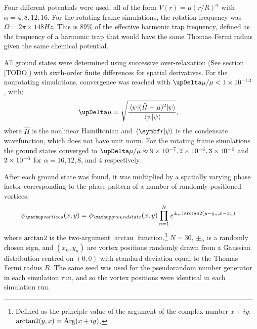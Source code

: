 Four different potentials were used, all of the form $V(r) = \mu \left(r/R\right)^\alpha$ with $\alpha = 4, 8, 12, 16$. For the rotating frame simulations, the rotation frequency was $\Omega = 2\pi \times 148\unit{Hz}$. This is $89\%$ of the effective harmonic trap frequency, defined as the frequency of a harmonic trap that would have the same Thomas--Fermi radius given the same chemical potential.

All ground states were determined using successive over-relaxation (See section [TODO]) with sixth-order finite differences for spatial derivatives. For the nonrotating simulations, convergence was reached with $\upDelta\mu/\mu < 1\E{-13}$, with:
\begin{equation}
\upDelta\mu = \sqrt{\frac{\matrixel{\psi} {(\hat H - \mu)^2}{\psi}}{\braket {\psi}{\psi}}},
\end{equation}
where $\hat H$ is the nonlinear Hamiltonian and $\braket{\vec r}{\psi}$ is the condensate wavefunction, which does not have unit norm. For the rotating frame simulations the ground states converged to $\upDelta\mu/\mu \approx 9\E{-7}, 2\E{-6}, 3\E{-6}$ and $2\times 10^{-6}$ for $\alpha = 16, 12, 8$, and $4$ respectively.

After each ground state was found, it was multiplied by a spatially varying phase factor corresponding to the phase pattern of a number of randomly positioned vortices:
\begin{align}
\psi_\up{vortices}(x, y) = \psi_\up{ground state}(x, y)\prod_{n=1}^N e^{\pm_n i\arctantwo(y - y_n, x - x_n)}
\end{align}
where $\operatorname{arctan2}$ is the two-argument $\arctan$ function,\footnote{Defined as the principle value of the argument of the complex number $x + iy$: \mbox{$\operatorname{arctan2}(y, x) = \operatorname{Arg}(x + iy)$.}} $N=30$, $\pm_n$ is a randomly chosen sign, and $(x_n, y_n)$ are vortex positions randomly drawn from a Gaussian distribution centred on $(0,0)$ with standard deviation equal to the Thomas--Fermi radius $R$. The same seed was used for the pseudorandom number generator in each simulation run, and so the vortex positions were identical in each simulation run.

